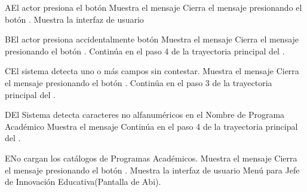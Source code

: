 \begin{UCtrayectoriaA}{A}{El actor presiona el botón }
    \UCpaso Muestra el mensaje 
    \UCpaso[\UCactor] Cierra el mensaje presionando el botón .
    \UCpaso Muestra la interfaz de usuario 
\end{UCtrayectoriaA}
\begin{UCtrayectoriaA}{B}{El actor presiona accidentalmente botón }
    \UCpaso Muestra el mensaje
    \UCpaso[\UCactor] Cierra el mensaje presionando el botón .
    \UCpaso Continúa en el paso 4 de la trayectoria principal del .
\end{UCtrayectoriaA}
\begin{UCtrayectoriaA}{C}{El sistema detecta uno o más campos sin contestar.}
    \UCpaso Muestra el mensaje 
    \UCpaso[\UCactor] Cierra el mensaje presionando el botón .
    \UCpaso Continúa en el paso 3 de la trayectoria principal del .
\end{UCtrayectoriaA}
\begin{UCtrayectoriaA}{D}{El Sistema detecta caracteres no alfanuméricos en el Nombre de Programa Académico}
    \UCpaso Muestra el mensaje 
    \UCpaso Continúa en el paso 4 de la trayectoria principal del .
\end{UCtrayectoriaA}
\begin{UCtrayectoriaA}{E}{No cargan los catálogos de Programas Académicos.}
    \UCpaso Muestra el mensaje 
    \UCpaso[\UCactor] Cierra el mensaje presionando el botón .
\UCpaso Muestra la interfaz de usuario Menú para Jefe de Innovación Educativa(Pantalla de Abi).
\end{UCtrayectoriaA}